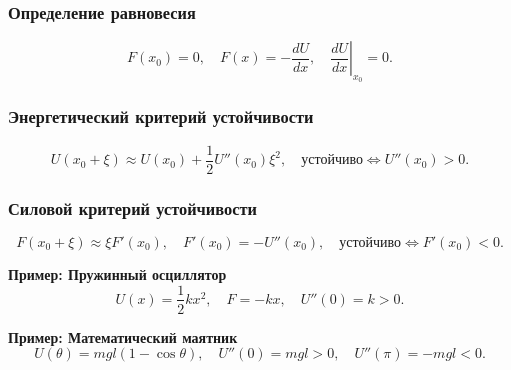 \documentclass[12pt, a4paper]{article}
\begin{document}
\subsubsection*{Определение равновесия}
\[
F(x_0)=0, \quad F(x)=-\frac{dU}{dx}, \quad \left.\frac{dU}{dx}\right|_{x_0}=0.
\]

\subsubsection*{Энергетический критерий устойчивости}
\[
U(x_0+\xi) \approx U(x_0) + \frac12 U''(x_0) \xi^2,
\quad
\text{устойчиво} \Leftrightarrow U''(x_0) > 0.
\]

\subsubsection*{Силовой критерий устойчивости}
\[
F(x_0+\xi) \approx \xi F'(x_0), \quad F'(x_0) = -U''(x_0),
\quad
\text{устойчиво} \Leftrightarrow F'(x_0) < 0.
\]

\textbf{Пример: Пружинный осциллятор}
\[
U(x) = \frac12 k x^2, \quad F = -kx, \quad U''(0) = k > 0.
\]

\textbf{Пример: Математический маятник}
\[
U(\theta) = mgl (1 - \cos \theta), \quad U''(0) = mgl > 0, \quad U''(\pi) = -mgl < 0.
\]
\end{document}
